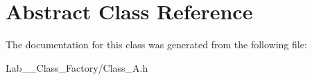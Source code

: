 \hypertarget{class_abstract}{\section{Abstract Class Reference}
\label{class_abstract}
}


The documentation for this class was generated from the following file\+:\begin{DoxyCompactItemize}
\item 
Lab\+\_\+\_\+\+Class\+\_\+\+Factory/Class\+\_\+\+A.\+h\end{DoxyCompactItemize}
